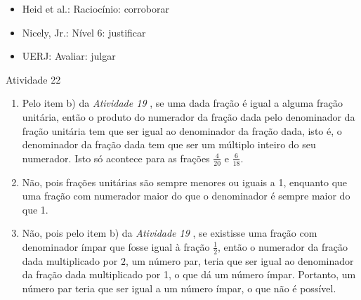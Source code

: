    \vspace{.1cm}

 \vspace{.1cm}

\begin{itemize} %
    \item       Heid et al.: Raciocínio: corroborar
    \item       Nicely, Jr.: Nível 6: justificar
    \item       UERJ: Avaliar: julgar
\end{itemize} %

\begin{resposta*}{Atividade 22}
\begin{enumerate} [\quad a)] %
    \item       Pelo item b) da \emph{Atividade 19}      , se uma dada fração é
igual a alguma fração unitária, então o produto do numerador da fração dada pelo
denominador da fração unitária tem que ser igual ao denominador da fração dada,
isto é, o denominador da fração dada tem que ser um múltiplo inteiro do seu
numerador. Isto só acontece para as frações       $\frac{4}{20}$       e
$\frac{6}{18}$.
    \item       Não, pois frações unitárias são sempre menores ou iguais a 1,
enquanto que uma fração com numerador maior do que o denominador é sempre maior
do que 1.
\newpage

    \item       Não, pois pelo item b) da \emph{Atividade 19}      , se
existisse uma fração com denominador ímpar que fosse igual à fração
$\frac{1}{2}$, então o numerador da fração dada multiplicado por       $2$, um
número par, teria que ser igual ao denominador da fração dada multiplicado por
1, o que dá um número ímpar. Portanto, um número par teria que ser igual a um
número ímpar, o que não é possível.
\end{enumerate} %

\end{resposta*}

